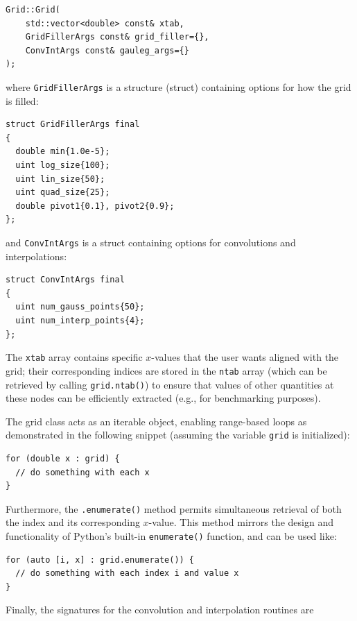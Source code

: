 \documentclass[preprint,12pt]{elsarticle}
\begin{document}
\begin{verbatim}
Grid::Grid(
    std::vector<double> const& xtab,
    GridFillerArgs const& grid_filler={},
    ConvIntArgs const& gauleg_args={}
);
\end{verbatim}

where \texttt{GridFillerArgs} is a structure (struct) containing options for how the grid is filled:

\begin{verbatim}
struct GridFillerArgs final
{
  double min{1.0e-5};
  uint log_size{100};
  uint lin_size{50};
  uint quad_size{25};
  double pivot1{0.1}, pivot2{0.9};
};
\end{verbatim}

and \texttt{ConvIntArgs} is a struct containing options for convolutions and interpolations:

\begin{verbatim}
struct ConvIntArgs final
{
  uint num_gauss_points{50};
  uint num_interp_points{4};
};
\end{verbatim}

The \texttt{xtab} array contains specific $x$-values that the user wants aligned with the grid; their corresponding indices are stored in the \texttt{ntab} array (which can be retrieved by calling \texttt{grid.ntab()}) to ensure that values of other quantities at these nodes can be efficiently extracted (e.g., for benchmarking purposes).

The grid class acts as an iterable object, enabling range-based loops as demonstrated in the following snippet (assuming the variable \texttt{grid} is initialized):

\begin{verbatim}
for (double x : grid) {
  // do something with each x
}
\end{verbatim}

Furthermore, the \texttt{.enumerate()} method permits simultaneous retrieval of both the index and its corresponding $x$-value. This method mirrors the design and functionality of Python's built-in \texttt{enumerate()} function, and can be used like:

\begin{verbatim}
for (auto [i, x] : grid.enumerate()) {
  // do something with each index i and value x
}
\end{verbatim}

Finally, the signatures for the convolution and interpolation routines are
\end{document}
